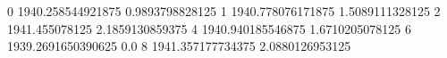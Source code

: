 0 1940.258544921875 0.9893798828125
1 1940.778076171875 1.5089111328125
2 1941.455078125 2.1859130859375
4 1940.940185546875 1.6710205078125
6 1939.2691650390625 0.0
8 1941.357177734375 2.0880126953125
